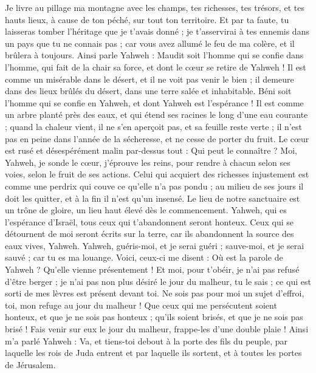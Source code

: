\begin{multicols}{2}
Je livre au pillage ma montagne avec les champs, tes richesses, tes trésors, et tes hauts lieux, à cause de ton péché, sur tout ton territoire.
Et par ta faute, tu laisseras tomber l'héritage que je t'avais donné ; je t’asservirai à tes ennemis dans un pays que tu ne connais pas ; car vous avez allumé le feu de ma colère, et il brûlera à toujours.
Ainsi parle Yahweh : Maudit soit l'homme qui se confie dans l'homme, qui fait de la chair sa force, et dont le cœur se retire de Yahweh !
Il est comme un misérable dans le désert, et il ne voit pas venir le bien ; il demeure dans des lieux brûlés du désert, dans une terre salée et inhabitable.
Béni soit l'homme qui se confie en Yahweh, et dont Yahweh est l’espérance !
Il est comme un arbre planté près des eaux, et qui étend ses racines le long d'une eau courante ; quand la chaleur vient, il ne s'en aperçoit pas, et sa feuille reste verte ; il n’est pas en peine dans l'année de la sécheresse, et ne cesse de porter du fruit.
Le cœur est rusé et désespérément malin par-dessus tout : Qui peut le connaître ?
Moi, Yahweh, je sonde le cœur, j’éprouve les reins, pour rendre à chacun selon ses voies, selon le fruit de ses actions.
Celui qui acquiert des richesses injustement est comme une perdrix qui couve ce qu'elle n'a pas pondu ; au milieu de ses jours il doit les quitter, et à la fin il n’est qu’un insensé.
Le lieu de notre sanctuaire est un trône de gloire, un lieu haut élevé dès le commencement.
Yahweh, qui es l'espérance d'Israël, tous ceux qui t'abandonnent seront honteux. Ceux qui se détournent de moi seront écrits sur la terre, car ils abandonnent la source des eaux vives, Yahweh.
Yahweh, guéris-moi, et je serai guéri ; sauve-moi, et je serai sauvé ; car tu es ma louange.
Voici, ceux-ci me disent : Où est la parole de Yahweh ? Qu’elle vienne présentement !
Et moi, pour t’obéir, je n’ai pas refusé d’être berger ; je n’ai pas non plus désiré le jour du malheur, tu le sais ; ce qui est sorti de mes lèvres est présent devant toi.
Ne sois pas pour moi un sujet d’effroi, toi, mon refuge au jour du malheur !
Que ceux qui me persécutent soient honteux, et que je ne sois pas honteux ; qu'ils soient brisés, et que je ne sois pas brisé ! Fais venir sur eux le jour du malheur, frappe-les d'une double plaie !
Ainsi m’a parlé Yahweh : Va, et tiens-toi debout à la porte des fils du peuple, par laquelle les rois de Juda entrent et par laquelle ils sortent, et à toutes les portes de Jérusalem.

\end{multicols}
